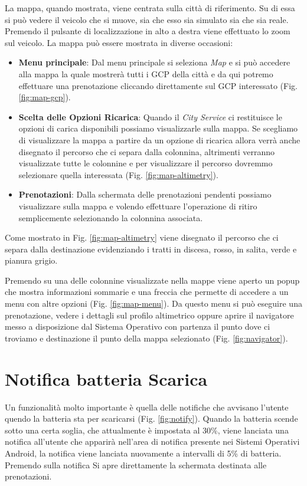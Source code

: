 La mappa, quando mostrata, viene centrata sulla città di riferimento. Su di essa si può vedere il veicolo che si muove, sia che esso sia simulato sia che sia reale. Premendo il pulsante di localizzazione in alto a destra viene effettuato lo zoom sul veicolo. La mappa può essere mostrata in diverse occasioni:

\begin{itemize}
	\item \textbf{Menu principale}: Dal menu principale si seleziona \emph{Map} e si può accedere alla mappa la quale mostrerà tutti i GCP della città e da qui potremo effettuare una prenotazione cliccando direttamente sul GCP interessato (Fig. \ref{fig:map-gcp}).
	\item \textbf{Scelta delle Opzioni Ricarica}: Quando il \emph{City Service} ci restituisce le opzioni di carica disponibili possiamo visualizzarle sulla mappa. Se scegliamo di visualizzare la mappa a partire da un opzione di ricarica allora verrà anche disegnato il percorso che ci separa dalla colonnina, altrimenti verranno visualizzate tutte le colonnine e per visualizzare il percorso dovremmo selezionare quella interessata (Fig. \ref{fig:map-altimetry}). 
	\item \textbf{Prenotazioni}: Dalla schermata delle prenotazioni pendenti possiamo visualizzare sulla mappa e volendo effettuare l'operazione di ritiro semplicemente selezionando la colonnina associata.
\end{itemize}

Come mostrato in Fig. \ref{fig:map-altimetry} viene disegnato il percorso che ci separa dalla destinazione evidenziando i tratti in discesa, rosso, in salita, verde e pianura grigio.

Premendo su una delle colonnine visualizzate nella mappe viene aperto un popup che mostra informazioni sommarie e una freccia che permette di accedere a un menu con altre opzioni (Fig. \ref{fig:map-menu}). Da questo menu si può eseguire una prenotazione, vedere i dettagli sul profilo altimetrico oppure aprire il navigatore messo a disposizione dal Sistema Operativo con partenza il punto dove ci troviamo e destinazione il punto della mappa selezionato (Fig. \ref{fig:navigator}).

\section{Notifica batteria Scarica}

Un funzionalità molto importante è quella delle notifiche che avvisano l'utente quendo la batteria sta per scaricarsi (Fig. \ref{fig:notify}). Quando la batteria scende sotto una certa soglia, che attualmente è impostata al 30\%, viene lanciata una notifica all'utente che apparirà nell'area di notifica presente nei Sistemi Operativi Android, la notifica viene lanciata nuovamente a intervalli di 5\% di batteria. Premendo sulla notifica Si apre direttamente la schermata destinata alle prenotazioni.

